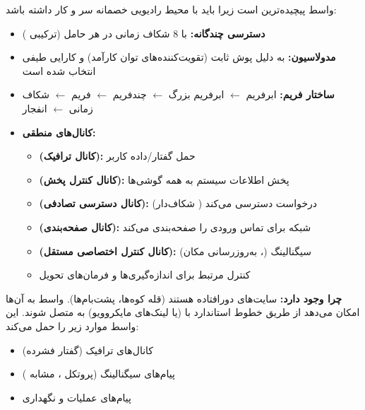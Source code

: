 
واسط  پیچیده‌ترین است زیرا باید با محیط رادیویی خصمانه سر و کار داشته باشد:

\begin{itemize}
\tightlist
\item
  \textbf{دسترسی چندگانه:}  با 8 شکاف زمانی در هر حامل  (ترکیبی )
\item
  \textbf{مدولاسیون:}   به دلیل پوش ثابت (تقویت‌کننده‌های توان کارآمد) و کارایی طیفی انتخاب شده است
\item
  \textbf{ساختار فریم:} ابرفریم \ensuremath{\leftarrow} ابرفریم بزرگ \ensuremath{\leftarrow} چندفریم \ensuremath{\leftarrow} فریم \ensuremath{\leftarrow} شکاف زمانی \ensuremath{\leftarrow} انفجار
\item
  \textbf{کانال‌های منطقی:}

  \begin{itemize}
  \tightlist
  \item
    \textbf{ (کانال ترافیک):} حمل گفتار/\allowbreak{}داده کاربر
  \item
    \textbf{ (کانال کنترل پخش):} پخش اطلاعات سیستم به همه گوشی‌ها
  \item
    \textbf{ (کانال دسترسی تصادفی):}  درخواست دسترسی می‌کند ( شکاف‌دار)
  \item
    \textbf{ (کانال صفحه‌بندی):} شبکه برای تماس ورودی  را صفحه‌بندی می‌کند
  \item
    \textbf{ (کانال کنترل اختصاصی مستقل):} سیگنالینگ (، به‌روزرسانی مکان)
  \item
     کنترل مرتبط برای اندازه‌گیری‌ها و فرمان‌های تحویل
  \end{itemize}
\end{itemize}


\textbf{چرا وجود دارد:} سایت‌های  دورافتاده هستند (قله کوه‌ها، پشت‌بام‌ها). واسط  به آن‌ها امکان می‌دهد از طریق خطوط استاندارد  با  (یا لینک‌های مایکروویو) به  متصل شوند. این واسط موارد زیر را حمل می‌کند:

\begin{itemize}
\tightlist
\item
  کانال‌های ترافیک  (گفتار فشرده)
\item
  پیام‌های سیگنالینگ (پروتکل ، مشابه )
\item
  پیام‌های عملیات و نگهداری
\end{itemize}

